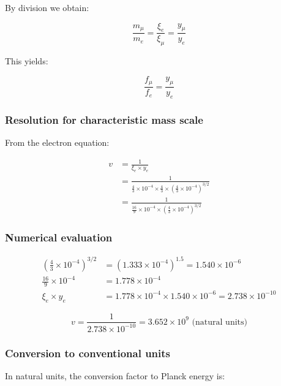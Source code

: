 By division we obtain:

\begin{equation}
	\frac{m_\mu}{m_e} = \frac{\xi_e}{\xi_\mu} = \frac{y_\mu}{y_e}
\end{equation}

This yields:

\begin{equation}
	\frac{f_\mu}{f_e} = \frac{y_\mu}{y_e}
\end{equation}

\subsubsection{Resolution for characteristic mass scale}

From the electron equation:

\begin{align}
	v &= \frac{1}{\xi_e \times y_e}\\
	&= \frac{1}{\frac{4}{3} \times 10^{-4} \times \frac{4}{3} \times \left(\frac{4}{3} \times 10^{-4}\right)^{3/2}}\\
	&= \frac{1}{\frac{16}{9} \times 10^{-4} \times \left(\frac{4}{3} \times 10^{-4}\right)^{3/2}}
\end{align}

\subsubsection{Numerical evaluation}

\begin{align}
	\left(\frac{4}{3} \times 10^{-4}\right)^{3/2} &= (1.333 \times 10^{-4})^{1.5} = 1.540 \times 10^{-6}\\
	\frac{16}{9} \times 10^{-4} &= 1.778 \times 10^{-4}\\
	\xi_e \times y_e &= 1.778 \times 10^{-4} \times 1.540 \times 10^{-6} = 2.738 \times 10^{-10}
\end{align}

\begin{equation}
	v = \frac{1}{2.738 \times 10^{-10}} = 3.652 \times 10^9 \text{ (natural units)}
\end{equation}

\subsubsection{Conversion to conventional units}

In natural units, the conversion factor to Planck energy is:

